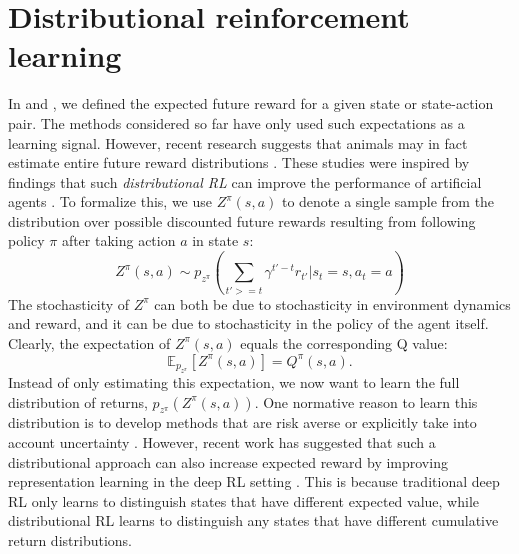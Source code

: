 \section{Distributional reinforcement learning}
\label{sec:distributional}

In  and , we defined the expected future reward for a given state or state-action pair.
The methods considered so far have only used such expectations as a learning signal.
However, recent research suggests that animals may in fact estimate entire future reward distributions \citep{dabney2020distributional, sousa2023dopamine}.
These studies were inspired by findings that such \emph{distributional RL} can improve the performance of artificial agents \citep{bellemare2017distributional, bellemare2023distributional,dabney2018distributional}.
To formalize this, we use $Z^\pi(s, a)$ to denote a single sample from the distribution over possible discounted future rewards resulting from following policy $\pi$ after taking action $a$ in state $s$:
\begin{equation}
    Z^\pi(s, a) \sim p_{z^\pi} \left ( \sum_{t' >= t} \gamma^{t' - t} r_{t'} | s_t = s, a_t = a \right )
\end{equation}
The stochasticity of $Z^\pi$ can both be due to stochasticity in environment dynamics and reward, and it can be due to stochasticity in the policy of the agent itself.
Clearly, the expectation of $Z^\pi(s, a)$ equals the corresponding Q value:
\begin{equation}
    \mathbb{E}_{p_{z^\pi}} \left [ Z^\pi(s, a) \right ] = Q^\pi(s, a).
\end{equation}
Instead of only estimating this expectation, we now want to learn the full distribution of returns, $p_{z^\pi}(Z^\pi(s, a))$.
One normative reason to learn this distribution is to develop methods that are risk averse \citep{morimura2010nonparametric,morimura2012parametric} or explicitly take into account uncertainty \citep{dearden1998bayesian}.
However, recent work has suggested that such a distributional approach can also increase expected reward by improving representation learning in the deep RL setting \citep{bellemare2017distributional,dabney2018distributional,rowland2019statistics,bellemare2023distributional}.
This is because traditional deep RL only learns to distinguish states that have different expected value, while distributional RL learns to distinguish any states that have different cumulative return distributions.

